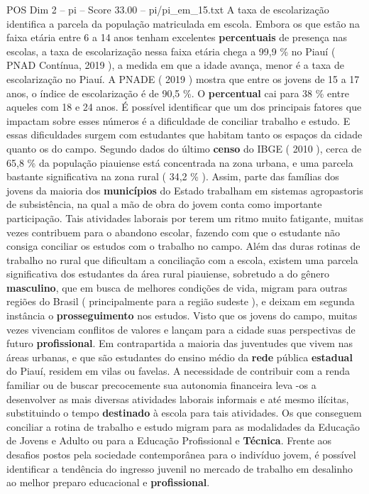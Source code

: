 \begin{textsample}{POS Dim 2 – pi – Score 33.00 – pi/pi\_em\_15.txt}
A taxa de escolarização identifica a parcela da população matriculada em escola.
Embora os que estão na faixa etária entre 6 a 14 anos tenham excelentes \textbf{percentuais} de presença nas escolas, a taxa de escolarização nessa faixa etária chega a 99,9 \% no Piauí ( PNAD Contínua, 2019 ), a medida em que a idade avança, menor é a taxa de escolarização no Piauí.
A PNADE ( 2019 ) mostra que entre os jovens de 15 a 17 anos, o índice de escolarização é de 90,5 \%.
O \textbf{percentual} cai para 38 \% entre aqueles com 18 e 24 anos.
É possível identificar que um dos principais fatores que impactam sobre esses números é a dificuldade de conciliar trabalho e estudo.
E essas dificuldades surgem com estudantes que habitam tanto os espaços da cidade quanto os do campo.
Segundo dados do último \textbf{censo} do IBGE ( 2010 ), cerca de 65,8 \% da população piauiense está concentrada na zona urbana, e uma parcela bastante significativa na zona rural ( 34,2 \% ).
Assim, parte das famílias dos jovens da maioria dos \textbf{municípios} do Estado trabalham em sistemas agropastoris de subsistência, na qual a mão de obra do jovem conta como importante participação.
Tais atividades laborais por terem um ritmo muito fatigante, muitas vezes contribuem para o abandono escolar, fazendo com que o estudante não consiga conciliar os estudos com o trabalho no campo.
Além das duras rotinas de trabalho no rural que dificultam a conciliação com a escola, existem uma parcela significativa dos estudantes da área rural piauiense, sobretudo a do gênero \textbf{masculino}, que em busca de melhores condições de vida, migram para outras regiões do Brasil ( principalmente para a região sudeste ), e deixam em segunda instância o \textbf{prosseguimento} nos estudos.
Visto que os jovens do campo, muitas vezes vivenciam conflitos de valores e lançam para a cidade suas perspectivas de futuro \textbf{profissional}.
Em contrapartida a maioria das juventudes que vivem nas áreas urbanas, e que são estudantes do ensino médio da \textbf{rede} pública \textbf{estadual} do Piauí, residem em vilas ou favelas.
A necessidade de contribuir com a renda familiar ou de buscar precocemente sua autonomia financeira leva -os a desenvolver as mais diversas atividades laborais informais e até mesmo ilícitas, substituindo o tempo \textbf{destinado} à escola para tais atividades.
Os que conseguem conciliar a rotina de trabalho e estudo migram para as modalidades da Educação de Jovens e Adulto ou para a Educação Profissional e \textbf{Técnica}.
Frente aos desafios postos pela sociedade contemporânea para o indivíduo jovem, é possível identificar a tendência do ingresso juvenil no mercado de trabalho em desalinho ao melhor preparo educacional e \textbf{profissional}.

\end{textsample}
